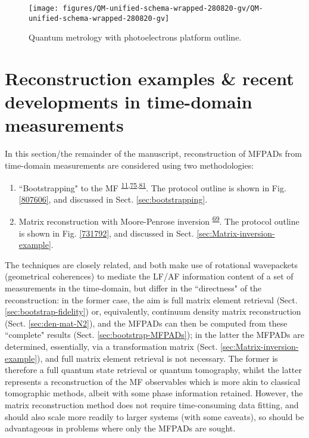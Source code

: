 \documentclass[10pt]{article}
\begin{document}
\begin{figure}[H]
\begin{center}
\texttt{[image: figures/QM-unified-schema-wrapped-280820-gv/QM-unified-schema-wrapped-280820-gv]}
\caption{{Quantum metrology with photoelectrons platform outline.
{\label{239231}}%
}}
\end{center}
\end{figure}

\section{Reconstruction examples \& recent developments in time-domain measurements\label{sec:Recon}}

In this section/the remainder of the manuscript, reconstruction of MFPADs from time-domain measurements are considered using two methodologies:

\begin{enumerate}
\item ``Bootstrapping" to the MF \textsuperscript{\hyperref[csl:11]{11},\hyperref[csl:75]{75},\hyperref[csl:81]{81}}. The protocol outline is shown in Fig. \ref{807606}, and discussed in Sect. \ref{sec:bootstrapping}.
\item Matrix reconstruction with Moore-Penrose inversion \textsuperscript{\hyperref[csl:69]{69}}. The protocol outline is shown in Fig. \ref{731792}, and discussed in Sect. \ref{sec:Matrix-inversion-example}.
\end{enumerate}

The techniques are closely related, and both make use of rotational wavepackets (geometrical coherences) to mediate the LF/AF information content of a set of measurements in the time-domain, but differ in the ``directness" of the reconstruction: in the former case, the aim is full matrix element retrieval (Sect. \ref{sec:bootstrap-fidelity}) or, equivalently, continuum density matrix reconstruction (Sect. \ref{sec:den-mat-N2}), and the MFPADs can then be computed from these ``complete" results (Sect. \ref{sec:bootstrap-MFPADs}); in the latter the MFPADs are determined, essentially, via a transformation matrix (Sect. \ref{sec:Matrix-inversion-example}), and full matrix element retrieval is not necessary. The former is therefore a full quantum state retrieval or quantum tomography, whilst the latter represents a reconstruction of the MF observables which is more akin to classical tomographic methods, albeit with some phase information retained. %
However, the matrix reconstruction method does not require time-consuming data fitting, and should also scale more readily to larger systems (with some caveats), so should be advantageous in problems where only the MFPADs are sought.
\end{document}
